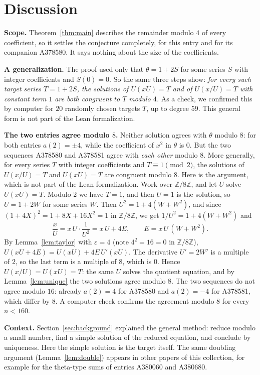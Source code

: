 \documentclass[11pt,a4paper]{article}
\theoremstyle{definition}
\theoremstyle{remark}
\newcommand{\Z}{\mathbb{Z}}
\newcommand{\para}[1]{\par\medskip\noindent\textbf{#1}\enspace}
\begin{document}
\section{Discussion}\label{sec:discussion}

\para{Scope.} Theorem~\ref{thm:main} describes the remainder modulo $4$ of every coefficient, so it settles the
conjecture completely, for this entry and for its companion A378580. It says nothing about the size of the
coefficients.

\para{A generalization.} The proof used only that $\theta=1+2S$ for some series $S$ with integer coefficients and
$S(0)=0$. So the same three steps show: \emph{for every such target series $T=1+2S$, the solutions of $U(xU)=T$ and of
$U(x/U)=T$ with constant term $1$ are both congruent to $T$ modulo $4$.} As a check, we confirmed this by computer for
$20$ randomly chosen targets $T$, up to degree $59$. This general form is not part of the Lean formalization.

\para{The two entries agree modulo $8$.} Neither solution agrees with $\theta$ modulo $8$: for both entries
$a(2)=\pm4$, while the coefficient of $x^2$ in $\theta$ is $0$. But the two sequences A378580 and A378581 agree with
\emph{each other} modulo $8$. More generally, for every series $T$ with integer coefficients and $T\equiv1\pmod 2$, the
solutions of $U(x/U)=T$ and $U(xU)=T$ are congruent modulo $8$. Here is the argument, which is not part of the Lean
formalization. Work over $\Z/8\Z$, and let $U$ solve $U(xU)=T$. Modulo $2$ we have $T=1$, and then $U=1$ is the
solution, so $U=1+2W$ for some series $W$. Then $U^2=1+4(W+W^2)$, and since $(1+4X)^2=1+8X+16X^2=1$ in $\Z/8\Z$, we get
$1/U^2=1+4(W+W^2)$ and
\[
\frac xU=x\,U\cdot\frac1{U^2}=x\,U+4E,\qquad E=x\,U\,(W+W^2).
\]
By Lemma~\ref{lem:taylor} with $\varepsilon=4$ (note $4^2=16=0$ in $\Z/8\Z$),
$U(xU+4E)=U(xU)+4E\,U'(xU)$. The derivative $U'=2W'$ is a multiple of $2$, so the last term is a multiple of $8$, which
is $0$. Hence $U(x/U)=U(xU)=T$: the same $U$ solves the quotient equation, and by Lemma~\ref{lem:unique} the two
solutions agree modulo $8$. The two sequences do not agree modulo $16$: already $a(2)=4$ for A378580 and $a(2)=-4$ for
A378581, which differ by $8$. A computer check confirms the agreement modulo $8$ for every $n<160$.

\para{Context.} Section~\ref{sec:background} explained the general method: reduce modulo a small number, find a simple
solution of the reduced equation, and conclude by uniqueness. Here the simple solution is the target itself. The same
doubling argument (Lemma~\ref{lem:double}) appears in other papers of this collection, for example for the theta-type
sums of entries A380060 and A380680.
\end{document}

